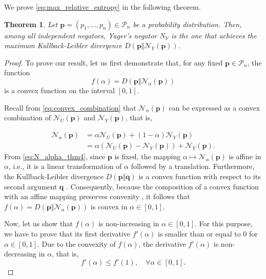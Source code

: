 \documentclass[pdflatex,sn-basic,iicol]{sn-jnl}%
\theoremstyle{thmstyleone}%
\newtheorem{theorem}{Theorem}%
\theoremstyle{thmstyletwo}%
\theoremstyle{thmstylethree}%
\newcommand{\N}{\mathcal{N}}
\newcommand{\cP}{\mathcal{P}}
\newcommand{\bp}{\mathbf{p}}
\newcommand{\bq}{\mathbf{q}}
\begin{document}
We  prove \eqref{eq:max_relative_entropy} in the following theorem.

\begin{theorem}\label{th:1}
    Let $\bp=(p_1,\dots,p_n)\in \cP_n$ be a probability distribution. Then, among all independent negators, Yager's negator $N_Y$ is  the one that achieves the maximum Kullback-Leibler divergence $D(\bp\Vert \N_Y(\bp))$.
\end{theorem}
\begin{proof}
    To prove our result, let us first 
    demonstrate that, for any fixed $\bp\in\cP_n$, the  {function 
    $$f(\alpha)=D(\bp\Vert \N_\alpha(\bp))$$
    is a convex function on the interval $[0,1]$.}
    {
        Recall from \eqref{eq:convex_combination} that $\N_\alpha(\bp)$ can be expressed as a convex combination of $\N_U(\bp)$ and $\N_Y(\bp)$, that is, 

        \begin{align}
            \N_\alpha(\bp) &= \alpha \N_U(\bp) + (1-\alpha) \N_Y(\bp)\nonumber\\
            &= \alpha(\N_U(\bp) -\N_Y(\bp))+\N_Y(\bp).\label{eq:N_alpha_thm4}
        \end{align}
        From \eqref{eq:N_alpha_thm4}, since $\bp$ is fixed, the mapping $\alpha\mapsto\N_\alpha(\bp)$ is affine in $\alpha$, i.e., 
        it is a linear transformation of $\alpha$ followed by a translation. Furthermore, the Kullback-Leibler divergence $D(\bp\Vert\bq)$ is a convex function with respect to its second argument $\bq$ \citep{CT}. Consequently, because the composition of a convex function with an affine mapping preserves convexity \citep{boyd2004convex}, it follows that $f(\alpha)=D(\bp\Vert \N_\alpha(\bp))$ is convex in $\alpha\in[0,1]$.

        Now, let us show that $f(\alpha)$ is non-increasing in $\alpha\in[0,1]$. For this purpose, we have to prove that its first derivative $f'(\alpha)$ is smaller than or equal to 0 for $\alpha\in[0,1]$. Due to the convexity of $f(\alpha)$, the derivative $f'(\alpha)$ is non-decreasing in $\alpha$, that is,
        \begin{equation}\label{eq:f_convexity}
            f'(\alpha)\leq f'(1), \quad\forall\alpha\in[0,1].
        \end{equation}
        
}
\end{proof}
\end{document}
